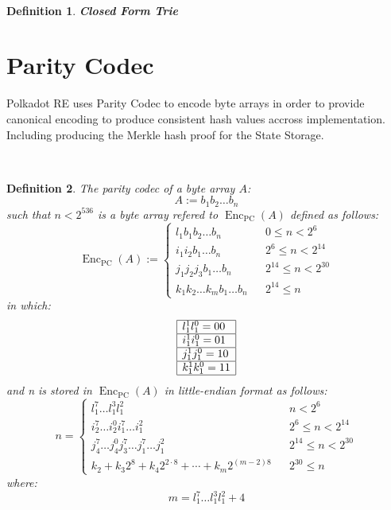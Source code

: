 \documentclass{article}
\newcommand{\assign}{:=}
\newcommand{\cdummy}{\cdot}
\newcommand{\tmop}[1]{\ensuremath{\operatorname{#1}}}
\newcommand{\tmstrong}[1]{\textbf{#1}}
\newtheorem{definition}{Definition}
\begin{document}
\

\begin{definition}
  \label{def-closed-form-trie}{\tmstrong{Closed Form Trie}} {}
\end{definition}

\section{Parity Codec}

Polkadot RE uses Parity Codec to encode byte arrays in order to provide
canonical encoding to produce consistent hash values accross implementation.
Including producing the Merkle hash proof for the State Storage.

\

\begin{definition}
  The parity codec of a byte array $A$:
  \[ A \assign b_1 b_2 \ldots b_n \]
  such that $n < 2^{536}$ is a byte array refered to $\tmop{Enc}_{\tmop{PC}}
  (A)$ defined as follows:
  \[ \tmop{Enc}_{\tmop{PC}} (A) \assign \left\{ \begin{array}{lll}
       l^{}_1 b_1 b_2 \ldots b_n &  & 0 \leqslant n < 2^6\\
       i^{}_1 i^{}_2 b_1 \ldots b_n &  & 2^6 \leqslant n < 2^{14}\\
       j^{}_1 j^{}_2 j_3 b_1 \ldots b_n &  & 2^{14} \leqslant n < 2^{30}\\
       k_1^{} k_2^{} \ldots k_m^{} b_1 \ldots b_n &  & 2^{14} \leqslant n
     \end{array} \right. \]
  in which:
  \[ \begin{array}{|l|}
       \hline
       l^1_1 l_1^0 = 00\\
       \hline
       i^1_1 i_1^0 = 01\\
       \hline
       j^1_1 j_1^0 = 10\\
       \hline
       k^1_1 k_1^0 = 11\\
       \hline
     \end{array} \]
  and n is stored in $\tmop{Enc}_{\tmop{PC}} (A)$ in little-endian format as
  follows:
  \[ n = \left\{ \begin{array}{lll}
       l^7_1 \ldots l^3_1 l^2_1 &  & n < 2^6\\
       i_2^7 \ldots i_2^0 i_1^7 \ldots i^2_1^{} &  & 2^6 \leqslant n <
       2^{14}\\
       j_4^7 \ldots j_4^0 j_3^7 \ldots j_1^7 \ldots j^2_1 &  & 2^{14}
       \leqslant n < 2^{30}\\
       k_2 + k_3 2^8 + k_4 2^{2 \cdummy 8} + \cdots + k_m 2^{(m - 2) 8} &  &
       2^{30} \leqslant n
     \end{array} \right. \]
  where:
  \[ m = l^7_1 \ldots l^3_1 l^2_1 + 4 \]
\end{definition}

\
\end{document}
